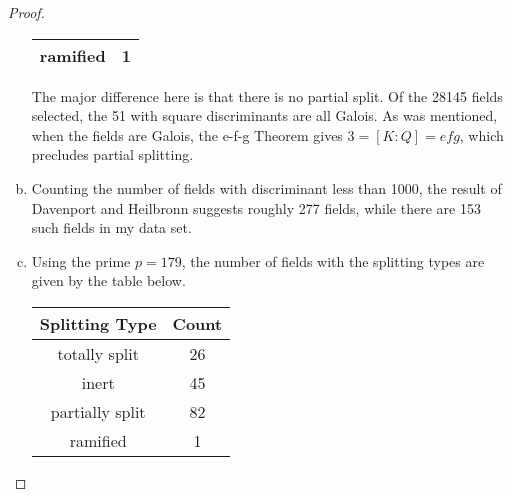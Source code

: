 \documentclass[10pt]{amsart}
\begin{document}
\begin{thm}
\begin{proof}
\begin{enumerate}[(a)]
\begin{center}
\begin{tabular}{|c|c|}
          \hline
          ramified & 1\\
          \hline
        \end{tabular}
      \end{center}
        The major difference here is that there is no partial split.
        Of the 28145 fields selected, the 51 with square discriminants are all Galois.
        As was mentioned, when the fields are Galois, the e-f-g Theorem gives $3 = [K : Q] = efg$, which precludes partial splitting.
      \item
        Counting the number of fields with discriminant less than 1000, the result of Davenport and Heilbronn suggests roughly 277 fields, while there are 153 such fields in my data set.
      \item
        Using the prime $p = 179$, the number of fields with the splitting types are given by the table below.
        \begin{center}
          \begin{tabular}{|c|c|}
            \hline
            Splitting Type & Count\\
            \hline
            totally split & 26\\ 
            \hline
            inert & 45\\ 
            \hline
            partially split & 82 \\
            \hline
            ramified & 1\\
            \hline
          \end{tabular}
        \end{center}
    \end{enumerate}
  \end{proof}
\end{thm}
\end{document}

